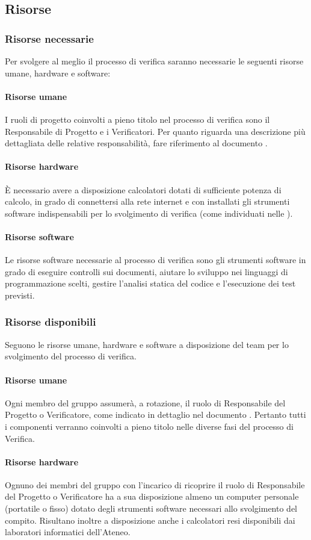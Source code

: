 	\subsection{Risorse}
		\subsubsection{Risorse necessarie}
		Per svolgere al meglio il processo di verifica saranno necessarie le seguenti risorse umane, hardware e software:
			\paragraph{Risorse umane}
			I ruoli di progetto coinvolti a pieno titolo nel processo di verifica sono il Responsabile di Progetto e i Verificatori. Per quanto riguarda una descrizione più dettagliata delle relative responsabilità, fare riferimento al documento \NdP .
			\paragraph{Risorse hardware}
			  È necessario avere a disposizione calcolatori dotati di sufficiente potenza di calcolo, in grado di connettersi alla rete internet e con installati gli strumenti software indispensabili per lo svolgimento di verifica (come individuati nelle \NdP).
			\paragraph{Risorse software}
			Le risorse software necessarie al processo di verifica sono gli strumenti software in grado di eseguire controlli sui documenti, aiutare lo sviluppo nei linguaggi di programmazione scelti, gestire l'analisi statica del codice e l'esecuzione dei test previsti.
		\subsubsection{Risorse disponibili}
		Seguono le risorse umane, hardware e software a disposizione del team per lo svolgimento del processo di verifica.
			\paragraph{Risorse umane}
			Ogni membro del gruppo assumerà, a rotazione, il ruolo di Responsabile del Progetto o Verificatore, come indicato in dettaglio nel documento \PdP. Pertanto tutti i componenti verranno coinvolti a pieno titolo nelle diverse fasi del processo di Verifica.
			\paragraph{Risorse hardware}
			Ognuno dei membri del gruppo con l'incarico di ricoprire il ruolo di Responsabile del Progetto o Verificatore ha a sua disposizione almeno un computer personale (portatile o fisso) dotato degli strumenti software necessari allo svolgimento del compito. Risultano inoltre a disposizione anche i calcolatori resi disponibili dai laboratori informatici dell'Ateneo.
